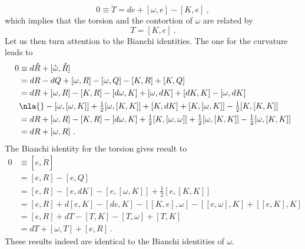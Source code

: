 \documentclass[11pt]{article}
\begin{document}
\begin{displaymath}
	0 \equiv \mathring{T} = de + [\omega,e] - [K,e]~,
\end{displaymath}
which implies that the torsion and the contortion of $\omega$ are 
related by
\begin{equation}
	T = [K,e]~.
\end{equation}
Let us then turn attention to the Bianchi identities. The one for 
the curvature leads to
\begin{align*}
	0 &\equiv d\mathring{R} + [\mathring{\omega},\mathring{R}] \\
	&= dR - dQ + [\omega,R] - [\omega,Q] - [K,R] + [K,Q] \\
	&= dR + [\omega,R] - [K,R] - [d\omega,K] + [\omega,dK] + 
	[dK,K] - [\omega,dK] \\
	&\nla{} - [\omega,[\omega,K]] + \tfrac{1}{2} [\omega,[K,K]] + 
	[K,dK] + [K,[\omega,K]] - \tfrac{1}{2} [K,[K,K]] \\
	&= dR + [\omega,R] - [K,R] - [d\omega,K] + \tfrac{1}{2} 
	[K,[\omega,\omega]] + \tfrac{1}{2} [\omega,[K,K]] - 
	\tfrac{1}{2} [\omega,[K,K]] \\
	&= dR + [\omega,R]~.
\end{align*}
The Bianchi identity for the torsion gives result to
\begin{align*}
	0 &\equiv [e,\mathring{R}] \\
	&= [e,R] - [e,Q] \\
	&= [e,R] - [e,dK] - [e,[\omega,K]] + \tfrac{1}{2} [e,[K,K]] \\
	&= [e,R] + d[e,K] - [de,K] - [[K,e],\omega] - [[e,\omega],K] + 
	[[e,K],K] \\
	&= [e,R] + dT - [T,K] - [T,\omega] + [T,K] \\
	&= dT + [\omega,T] + [e,R]~.
\end{align*}
These results indeed are identical to the Bianchi identities of 
$\omega$.




\end{document}
